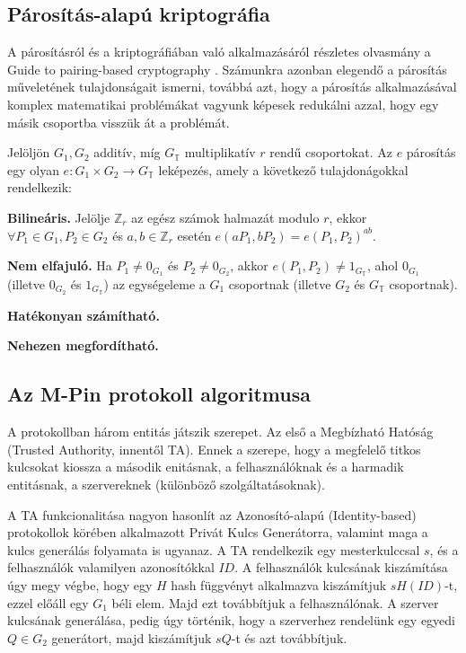 \subsection*{Párosítás-alapú kriptográfia}

A párosításról és a kriptográfiában való alkalmazásáról részletes olvasmány a Guide to pairing-based cryptography \cite{PBCGuide}. Számunkra azonban elegendő a párosítás műveletének tulajdonságait ismerni, továbbá azt, hogy a párosítás alkalmazásával komplex matematikai problémákat vagyunk képesek redukálni azzal, hogy egy másik csoportba visszük át a problémát.

Jelöljön $G_1, G_2$ additív, míg $G_\mathbb{T}$ multiplikatív $r$ rendű csoportokat. Az $e$ párosítás egy olyan $e : G_1 \times G_2 \rightarrow G_\mathbb{T}$ leképezés, amely a következő tulajdonágokkal rendelkezik:
\begin{outdentlist}
    \item[] \textbf{Bilineáris.} Jelölje $\mathbb{Z}_r$ az egész számok halmazát modulo $r$, ekkor $\forall P_1 \in G_1, P_2 \in G_2$ és $a, b \in \mathbb{Z}_r$ esetén $e(aP_1, bP_2) = e(P_1, P_2)^{ab}$.

    \item[] \textbf{Nem elfajuló.} Ha $P_1 \neq 0_{G_1}$ és $P_2 \neq 0_{G_2}$, akkor $e(P_1, P_2) \neq 1_{G_\mathbb{T}}$, ahol $0_{G_1}$ (illetve $0_{G_2}$ és $1_{G_\mathbb{T}}$) az egységeleme a $G_1$ csoportnak (illetve $G_2$ és $G_\mathbb{T}$ csoportnak).

    \item[] \textbf{Hatékonyan számítható.}

    \item[] \textbf{Nehezen megfordítható.}
\end{outdentlist}

\subsection*{Az M-Pin protokoll algoritmusa}

A protokollban három entitás játszik szerepet. Az első a Megbízható Hatóság (Trusted Authority, innentől TA). Ennek a szerepe, hogy a megfelelő titkos kulcsokat kiossza a második enitásnak, a felhasználóknak és a harmadik entitásnak, a szervereknek (különböző szolgáltatásoknak). 

A TA funkcionalitása nagyon hasonlít az Azonosító-alapú (Identity-based) protokollok körében alkalmazott Privát Kulcs Generátorra, valamint maga a kulcs generálás folyamata is ugyanaz. A TA rendelkezik egy mesterkulccsal $s$, és a felhasználók valamilyen azonosítókkal $ID$. A felhasználók kulcsának kiszámítása úgy megy végbe, hogy egy $H$ hash függvényt alkalmazva kiszámítjuk $sH(ID)$-t, ezzel előáll egy $G_1$ béli elem. Majd ezt továbbítjuk a felhasználónak. A szerver kulcsának generálása, pedig úgy történik, hogy a szerverhez rendelünk egy egyedi $Q \in G_2$ generátort, majd kiszámítjuk $sQ$-t és azt továbbítjuk.

